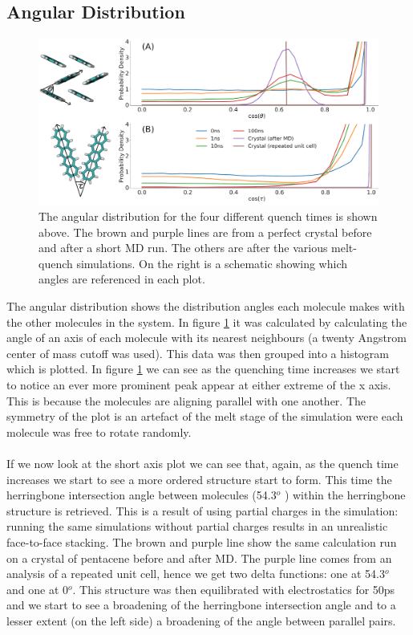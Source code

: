 \subsection{Angular Distribution}
\label{sect:ang_dist}
\begin{figure}[ht]
	\includegraphics[width=\textwidth]{../img/DifferentQuenchTimes/AngularDist.png}
	\caption{\label{fig:ang_dist}
	\noindent The angular distribution for the four different quench times is shown above. The brown and purple lines are from a perfect crystal before and after a short MD run. The others are after the various melt-quench simulations. On the right is a schematic showing which angles are referenced in each plot.}
\end{figure}
\noindent The angular distribution shows the distribution angles each molecule makes with the other molecules in the system. In figure \ref{fig:ang_dist} it was calculated by calculating the angle of an axis of each molecule with its nearest neighbours (a twenty Angstrom center of mass cutoff was used). This data was then grouped into a histogram which is plotted.
In figure \ref{fig:ang_dist} we can see as the quenching time increases we start to notice an ever more prominent peak appear at either extreme of the x axis. This is because the molecules are aligning parallel with one another. The symmetry of the plot is an artefact of the melt stage of the simulation were each molecule was free to rotate randomly.
\\\\
If we now look at the short axis plot we can see that, again, as the quench time increases we start to see a more ordered structure start to form. This time the herringbone intersection angle between molecules (54.3$^{o}$ \cite{PentaceneAngle}) within the herringbone structure is retrieved. This is a result of using partial charges in the simulation: running the same simulations without partial charges results in an unrealistic face-to-face stacking. The brown and purple line show the same calculation run on a crystal of pentacene before and after MD. The purple line comes from an analysis of a repeated unit cell, hence we get two delta functions: one at 54.3$^{o}$ and one at 0$^{o}$. This structure was then equilibrated with electrostatics for 50ps and we start to see a broadening of the herringbone intersection angle and to a lesser extent (on the left side) a broadening of the angle between parallel pairs.
